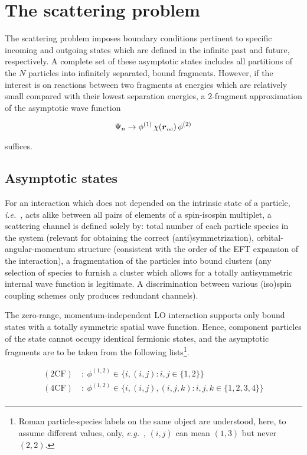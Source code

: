 \documentclass[aps,twocolumn,preprintnumbers,amsmath,amssymb,nofootinbib,superscriptaddress,notitlepage]{revtex4-1}
\newcommand{\eg}{\textit{e.g.}~}
\newcommand{\ie}{\textit{i.e.}~}
\newcommand{\be}{\begin{equation}}
\newcommand{\ee}{\end{equation}}
\newcommand{\vsp}[1]{\ensuremath{\boldsymbol{r}}_\text{\tiny #1}}
\newcommand{\la}{\label}
\begin{document}
\section{The scattering problem}\la{sec.scatprob}

The scattering problem imposes boundary conditions pertinent to specific incoming
and outgoing states which are defined in the infinite past and future, respectively.
A complete set of these asymptotic states includes all partitions of the $N$ particles
into infinitely separated, bound fragments. However, if the interest is on reactions
between two fragments at energies which are relatively small compared with their lowest
separation energies, a 2-fragment approximation of the asymptotic wave function

\be\la{eq.2frag}
\Psi_n\to\phi^{(1)}\,\chi(\vsp{\text{rel}})\,\phi^{(2)}
\ee

suffices.

\subsection{Asymptotic states}
For an interaction which does not depended on the intrinsic state of a particle, \ie,
acts alike between all pairs of elements of a spin-isospin multiplet, a scattering
channel is defined solely by: total number of each particle species in the system (relevant
for obtaining the correct (anti)symmetrization), orbital-angular-momentum structure (consistent with
the order of the EFT expansion of the interaction), a fragmentation of the particles into bound clusters
(any selection of species to furnish a cluster which allows for a totally antisymmetric internal wave function
is legitimate. A discrimination between various (iso)spin coupling schemes only produces redundant channels). 

The zero-range, momentum-independent LO interaction supports only bound states with a totally symmetric spatial wave function.
Hence, component particles of the state cannot occupy identical fermionic states, and the asymptotic fragments are
to be taken from the following lists\footnote{Roman particle-species labels on the same object are understood, here, to
assume different values, only, \eg, $(i,j)$ can mean $(1,3)$ but never $(2,2)$.}.

\begin{align*}
(2\text{CF})~&:~\phi^{(1,2)}\in\lbrace i,(i, j):i,j\in\lbrace 1,2\rbrace\rbrace\\
(4\text{CF})~&:~\phi^{(1,2)}\in\lbrace i,(i, j),(i, j, k):i,j,k\in\lbrace 1,2,3,4\rbrace\rbrace\\
\end{align*}
\end{document}
